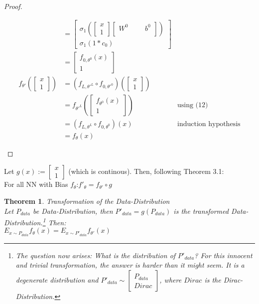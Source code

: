 \documentclass[a4paper]{article}
\newtheorem{theorem}{Theorem}[section]
\theoremstyle{definition}
\begin{document}
\begin{proof}
\begin{enumerate}
\begin{align}
            &=\begin{bmatrix}
                \sigma_1(\begin{bmatrix}x\\1\end{bmatrix}\begin{bmatrix}
                    W^0 & & & b^0\\
                \end{bmatrix})\\
                \sigma_1(1*c_0)
            \end{bmatrix}\\
            &=\begin{bmatrix}
                f_{0,\theta^0}(x)\\
                1
            \end{bmatrix}\\
            f_{\theta'}(\begin{bmatrix}x\\1\end{bmatrix}) &=(f_{L,\theta'^L} \circ f_{0,\theta'^0}) (\begin{bmatrix}x\\1\end{bmatrix})\\
            &= f_{\theta'^L}(\begin{bmatrix}
                f_{\theta^0}(x)\\
                1
            \end{bmatrix}) & \text{using (12)}\\
            &= (f_{L,\theta^L} \circ f_{0,\theta^0})(x) & \text{induction hypothesis}\\
            &= f_{\theta}(x)
        \end{align}
    \end{enumerate}
\end{proof}

Let $g(x) := \begin{bmatrix}x\\1\end{bmatrix}$ (which is continous). Then, following Theorem 3.1:\\
For all NN with Bias $f_{\theta}$:$f'_{\theta}=f_{\theta'} \circ g$

\begin{theorem}{Transformation of the Data-Distribution}\\
Let $P_{data}$ be Data-Distribution, then $P'_{data} = g(P_{data})$ is the transformed Data-Distribution.\footnote{The question now arises: What is the distribution of $P'_{data}$? For this innocent and trivial transformation, the answer is harder than it might seem. It is a degenerate distribution and $P'_{data} \sim \begin{bmatrix}P_{data}\\Dirac\end{bmatrix}$, where $Dirac$ is the Dirac-Distribution.}
Then:\\
$E_{x \sim P_{data}}f_{\theta}(x) = E_{x \sim P'_{data}}f_{\theta'}(x)$
\end{theorem}
\end{document}
